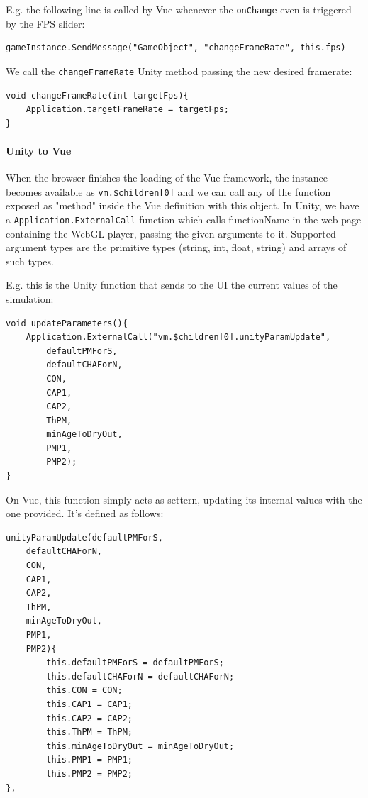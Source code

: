 E.g. the following line is called by Vue whenever the \texttt{onChange} even is triggered by the FPS slider:

\begin{verbatim}
gameInstance.SendMessage("GameObject", "changeFrameRate", this.fps)
\end{verbatim}

We call the \texttt{changeFrameRate} Unity method passing the new desired framerate:

\begin{verbatim}
void changeFrameRate(int targetFps){
    Application.targetFrameRate = targetFps;
}
\end{verbatim}

\paragraph{Unity to Vue}

When the browser finishes the loading of the Vue framework, the instance becomes available as \texttt{vm.\$children[0]} and we can call any of the function exposed as "method" inside the Vue definition with this object.
In Unity, we have a \texttt{Application.ExternalCall} function which calls functionName in the web page containing the WebGL player, passing the given arguments to it. Supported argument types are the primitive types (string, int, float, string) and arrays of such types.

E.g. this is the Unity function that sends to the UI the current values of the simulation:

\begin{verbatim}
void updateParameters(){
    Application.ExternalCall("vm.$children[0].unityParamUpdate",
        defaultPMForS,
        defaultCHAForN,
        CON,
        CAP1,
        CAP2,
        ThPM,
        minAgeToDryOut,
        PMP1,
        PMP2);
}
\end{verbatim}

On Vue, this function simply acts as settern, updating its internal values with the one provided. It's defined as follows:

\begin{verbatim}
unityParamUpdate(defaultPMForS,
    defaultCHAForN,
    CON,
    CAP1,
    CAP2,
    ThPM,
    minAgeToDryOut,
    PMP1,
    PMP2){
        this.defaultPMForS = defaultPMForS;
        this.defaultCHAForN = defaultCHAForN;
        this.CON = CON;
        this.CAP1 = CAP1;
        this.CAP2 = CAP2;
        this.ThPM = ThPM;
        this.minAgeToDryOut = minAgeToDryOut;
        this.PMP1 = PMP1;
        this.PMP2 = PMP2;
},
\end{verbatim}


